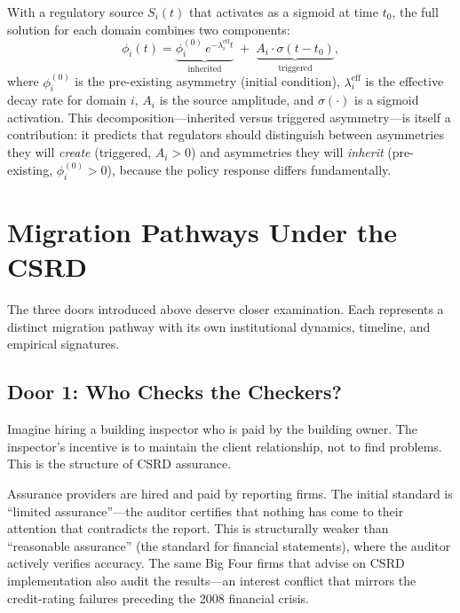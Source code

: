 \documentclass[12pt,a4paper]{article}
\begin{document}
With a regulatory source $S_i(t)$ that activates as a sigmoid at time $t_0$, the full solution for each domain combines two components:
\begin{equation}
\phi_i(t) = \underbrace{\phi_i^{(0)} \, e^{-\lambda_i^{\text{eff}} t}}_{\text{inherited}} \;+\; \underbrace{A_i \cdot \sigma(t - t_0)}_{\text{triggered}},
\label{eq:decomposition}
\end{equation}
where $\phi_i^{(0)}$ is the pre-existing asymmetry (initial condition), $\lambda_i^{\text{eff}}$ is the effective decay rate for domain $i$, $A_i$ is the source amplitude, and $\sigma(\cdot)$ is a sigmoid activation. This decomposition---inherited versus triggered asymmetry---is itself a contribution: it predicts that regulators should distinguish between asymmetries they will \textit{create} (triggered, $A_i > 0$) and asymmetries they will \textit{inherit} (pre-existing, $\phi_i^{(0)} > 0$), because the policy response differs fundamentally.


\section{Migration Pathways Under the CSRD}
\label{sec:csrd}

The three doors introduced above deserve closer examination. Each represents a distinct migration pathway with its own institutional dynamics, timeline, and empirical signatures.

\subsection{Door 1: Who Checks the Checkers?}

Imagine hiring a building inspector who is paid by the building owner. The inspector's incentive is to maintain the client relationship, not to find problems. This is the structure of CSRD assurance.

Assurance providers are hired and paid by reporting firms. The initial standard is ``limited assurance''---the auditor certifies that nothing has come to their attention that contradicts the report. This is structurally weaker than ``reasonable assurance'' (the standard for financial statements), where the auditor actively verifies accuracy. The same Big Four firms that advise on CSRD implementation also audit the results---an interest conflict that mirrors the credit-rating failures preceding the 2008 financial crisis.
\end{document}
